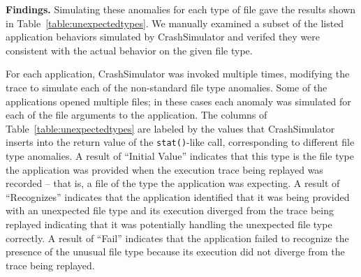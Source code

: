 
{\bf Findings.}
Simulating these anomalies for each type of file
gave the results shown in Table~\ref{table:unexpectedtypes}. 
We manually examined a subset of the listed application behaviors simulated by
CrashSimulator and verifed they were consistent with the actual behavior on the
given file type.


For each application, CrashSimulator was invoked multiple times,
modifying the trace to simulate each of the non-standard file type anomalies.
Some of the applications opened multiple files; in these cases each
anomaly was simulated for each of the file arguments to the application.
The columns of Table~\ref{table:unexpectedtypes} 
are labeled by the values that CrashSimulator inserts into
the return value of the {\tt stat()}-like call, corresponding to
different file type anomalies.
A result of ``Initial Value''
indicates that this type is the file type the application was provided when the
execution trace being replayed was recorded -- that is, a file of the type the
application was expecting.  A result of ``Recognizes'' indicates that the
application identified that it was being provided with an unexpected file type
and its execution diverged from the trace being replayed indicating that it was
potentially handling the unexpected file type correctly.  A result of ``Fail''
indicates that the application failed to recognize the presence of the unusual
file type because its execution did not diverge from the trace being replayed.


